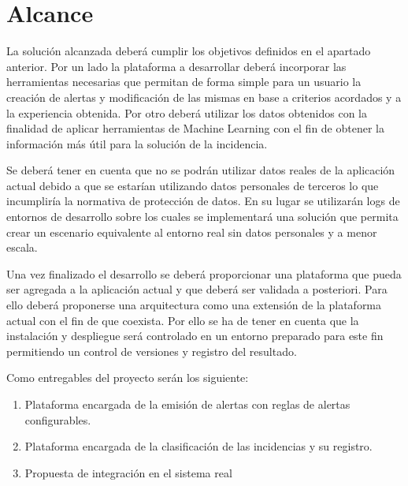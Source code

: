 \section{Alcance}

La solución alcanzada deberá cumplir los objetivos definidos en el apartado anterior. Por un lado la plataforma a desarrollar deberá incorporar las herramientas necesarias que permitan de forma simple para un usuario la creación de alertas y modificación de las mismas en base a criterios acordados y a la experiencia obtenida. Por otro deberá utilizar los datos obtenidos con la finalidad de aplicar herramientas de Machine Learning con el fin de obtener la información más útil para la solución de la incidencia.

Se deberá tener en cuenta que no se podrán utilizar datos reales de la aplicación actual debido a que se estarían utilizando datos personales de terceros lo que incumpliría la normativa de protección de datos. En su lugar se utilizarán logs de entornos de desarrollo sobre los cuales se implementará una solución que permita crear un escenario equivalente al entorno real sin datos personales y a menor escala.

Una vez finalizado el desarrollo se deberá proporcionar una plataforma que pueda ser agregada a la aplicación actual y que deberá ser validada a posteriori. Para ello deberá proponerse una arquitectura como una extensión de la plataforma actual con el fin de que coexista. Por ello se ha de tener en cuenta que la instalación y despliegue será controlado en un entorno preparado para este fin permitiendo un control de versiones y registro del resultado.

Como entregables del proyecto serán los siguiente:
\begin{enumerate}
\item Plataforma encargada de la emisión de alertas con reglas de alertas configurables.
\item Plataforma encargada de la clasificación de las incidencias y su registro.
\item Propuesta de integración en el sistema real
\end{enumerate}